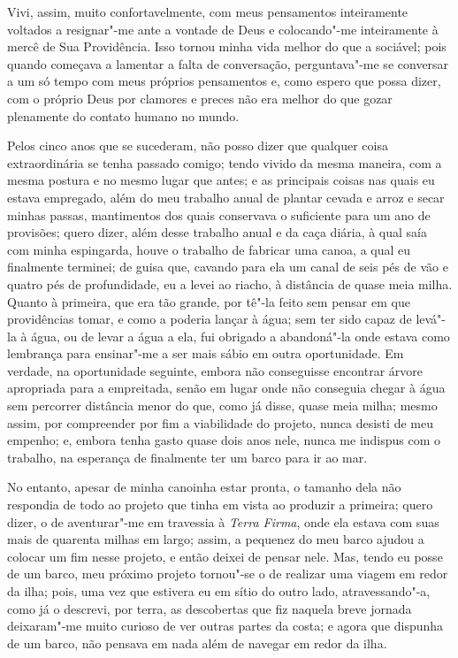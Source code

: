 Vivi, assim, muito confortavelmente, com meus pensamentos inteiramente
voltados a resignar"-me ante a vontade de Deus e colocando"-me
inteiramente à mercê de Sua Providência. Isso tornou minha vida melhor
do que a sociável; pois quando começava a lamentar a falta de
conversação, perguntava"-me se conversar a um só tempo com meus próprios
pensamentos e, como espero que possa dizer, com o próprio Deus por
clamores e preces não era melhor do que gozar plenamente do contato
humano no mundo.

Pelos cinco anos que se sucederam, não posso dizer que qualquer coisa
extraordinária se tenha passado comigo; tendo vivido da mesma maneira,
com a mesma postura e no mesmo lugar que antes; e as principais coisas
nas quais eu estava empregado, além do meu trabalho anual de plantar
cevada e arroz e secar minhas passas, mantimentos dos quais conservava o
suficiente para um ano de provisões; quero dizer, além desse trabalho
anual e da caça diária, à qual saía com minha espingarda, houve o
trabalho de fabricar uma canoa, a qual eu finalmente terminei; de guisa
que, cavando para ela um canal de seis pés de vão e quatro pés de
profundidade, eu a levei ao riacho, à distância de quase meia milha.
Quanto à primeira, que era tão grande, por tê"-la feito sem pensar em que
providências tomar, e como a poderia lançar à água; sem ter sido capaz
de levá"-la à água, ou de levar a água a ela, fui obrigado a abandoná"-la
onde estava como lembrança para ensinar"-me a ser mais sábio em outra
oportunidade. Em verdade, na oportunidade seguinte, embora não
conseguisse encontrar árvore apropriada para a empreitada, senão em
lugar onde não conseguia chegar à água sem percorrer distância menor do
que, como já disse, quase meia milha; mesmo assim, por compreender por
fim a viabilidade do projeto, nunca desisti de meu empenho; e, embora
tenha gasto quase dois anos nele, nunca me indispus com o trabalho, na
esperança de finalmente ter um barco para ir ao mar.

No entanto, apesar de minha canoinha estar pronta, o tamanho dela não
respondia de todo ao projeto que tinha em vista ao produzir a primeira;
quero dizer, o de aventurar"-me em travessia à \emph{Terra Firma}, onde
ela estava com suas mais de quarenta milhas em largo; assim, a pequenez
do meu barco ajudou a colocar um fim nesse projeto, e então deixei de
pensar nele. Mas, tendo eu posse de um barco, meu próximo projeto
tornou"-se o de realizar uma viagem em redor da ilha; pois, uma vez que
estivera eu em sítio do outro lado, atravessando"-a, como já o descrevi,
por terra, as descobertas que fiz naquela breve jornada deixaram"-me
muito curioso de ver outras partes da costa; e agora que dispunha de um
barco, não pensava em nada além de navegar em redor da ilha.

